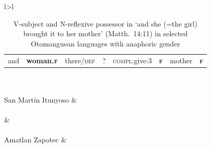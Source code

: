 \documentclass[output=collectionpaper]{langsci/langscibook}
\begin{document}
\begin{table}
{\begin{tabular}{l>{\setlength{\tabcolsep}{2pt}}l}
{\begin{tabular}{*{8}{l}}
                        and &\textbf{woman.\textsc{f}} &there/\textsc{def} &? &\textsc{compl}:give:3 &\textbf{\textsc{f}} &mother &\textbf{\textsc{f}}	\\
                        \end{tabular}
                        }\\
\\
\padding
San Martín Itunyoso 	&	\\
\\
\padding
{} 	&	\\
\\
\padding
Amatlan Zapotec	&	      \\
\\
\lspbottomrule
\end{tabular}}
\caption{V-subject and N-reflexive possessor in ‘and she (=the girl) brought it to her mother’ (Matth.~14:11) in selected Otomanguean languages with anaphoric gender}
\label{tab:BW:9}
\end{table}
\end{document}
